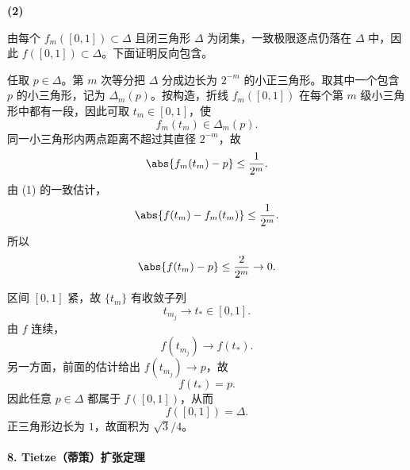 \textbf{(2)}
\begin{xsolution}
由每个 $f_m([0,1])\subset\Delta$ 且闭三角形 $\Delta$ 为闭集，一致极限逐点仍落在 $\Delta$ 中，因此 $f([0,1])\subset\Delta$。下面证明反向包含。

任取 $p\in\Delta$。第 $m$ 次等分把 $\Delta$ 分成边长为 $2^{-m}$ 的小正三角形。取其中一个包含 $p$ 的小三角形，记为 $\Delta_m(p)$。按构造，折线 $f_m([0,1])$ 在每个第 $m$ 级小三角形中都有一段，因此可取 $t_m\in[0,1]$，使
\[
  f_m(t_m)\in\Delta_m(p).
\]
同一小三角形内两点距离不超过其直径 $2^{-m}$，故
\[
  \abs{f_m(t_m)-p}\le\frac1{2^m}.
\]
由 (1) 的一致估计，
\[
  \abs{f(t_m)-f_m(t_m)}\le\frac1{2^m}.
\]
所以
\[
  \abs{f(t_m)-p}\le\frac2{2^m}\to0.
\]

区间 $[0,1]$ 紧，故 $\{t_m\}$ 有收敛子列
\[
  t_{m_j}\to t_*\in[0,1].
\]
由 $f$ 连续，
\[
  f(t_{m_j})\to f(t_*).
\]
另一方面，前面的估计给出 $f(t_{m_j})\to p$，故
\[
  f(t_*)=p.
\]
因此任意 $p\in\Delta$ 都属于 $f([0,1])$，从而
\[
  \boxed{f([0,1])=\Delta}.
\]
正三角形边长为 $1$，故面积为 $\sqrt3/4$。
\end{xsolution}

\paragraph{8. Tietze（蒂策）扩张定理}

